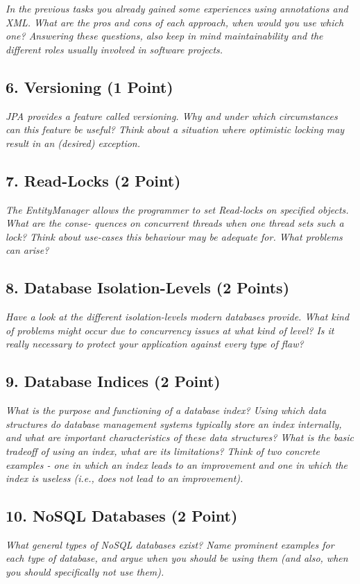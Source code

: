 \documentclass[a4paper,10pt]{article}
\begin{document}
\emph{In the previous tasks you already gained some experiences using annotations and XML. What are the
pros and cons of each approach, when would you use which one? Answering these questions, also keep
in mind maintainability and the different roles usually involved in software projects.}

\subsection{6. Versioning (1 Point)}

\emph{JPA provides a feature called versioning. Why and under which circumstances can this feature be useful?
Think about a situation where optimistic locking may result in an (desired) exception.}

\subsection{7. Read-Locks (2 Point)}

\emph{The EntityManager allows the programmer to set Read-locks on specified objects. What are the conse-
quences on concurrent threads when one thread sets such a lock? Think about use-cases this behaviour
may be adequate for. What problems can arise?}

\subsection{8. Database Isolation-Levels (2 Points)}

\emph{Have a look at the different isolation-levels modern databases provide. What kind of problems might
occur due to concurrency issues at what kind of level? Is it really necessary to protect your application
against every type of flaw?}

\subsection{9. Database Indices (2 Point)}

\emph{What is the purpose and functioning of a database index? Using which data structures do database
management systems typically store an index internally, and what are important characteristics of these
data structures? What is the basic tradeoff of using an index, what are its limitations? Think of two
concrete examples - one in which an index leads to an improvement and one in which the index is useless
(i.e., does not lead to an improvement).}

\subsection{10. NoSQL Databases (2 Point)}

\emph{What general types of NoSQL databases exist? Name prominent examples for each type of database,
and argue when you should be using them (and also, when you should specifically not use them).}
\end{document}
